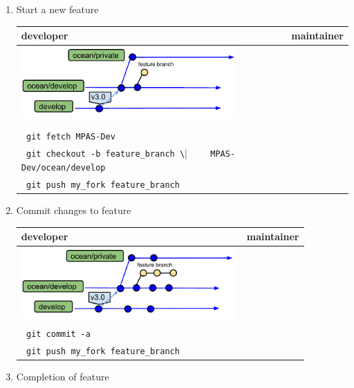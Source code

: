 \documentclass[11pt]{article}
\begin{document}
\begin{enumerate}
\item Start a new feature

 \begin{tabular}[c]{L{3.3in}|L{3.3in}}
developer & maintainer \\
\hline
\includegraphics[width=3.25in]{f/MPASworkflow_1.pdf} \\
\\
\verb| git fetch MPAS-Dev| \\
\verb| git checkout -b feature_branch \|
\verb|    MPAS-Dev/ocean/develop | \\
\verb| git push my_fork feature_branch|  & 
 \end{tabular}
\item Commit changes to feature 

 \begin{tabular}[c]{L{3.3in}|L{3.3in}}
developer & maintainer \\
\hline
\includegraphics[width=3.25in]{f/MPASworkflow_2.pdf} \\
\verb| git commit -a|  \\
\verb| git push my_fork feature_branch|  
 \end{tabular}

\clearpage
\item Completion of feature


\end{enumerate}
\end{document}

